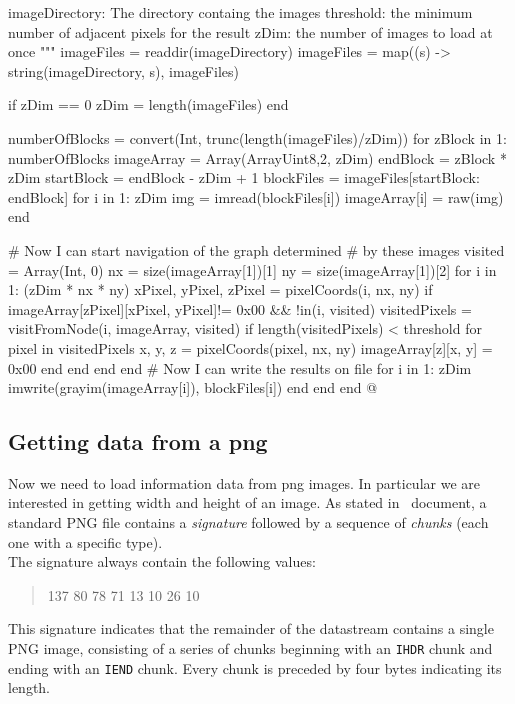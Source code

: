 \documentclass[11pt,oneside]{article}	%
\begin{document}
{  imageDirectory: The directory containg the images
  threshold: the minimum number of adjacent pixels for the result
  zDim: the number of images to load at once
  """
  imageFiles = readdir(imageDirectory)
  imageFiles = map((s) -> string(imageDirectory, s), imageFiles)

  if zDim == 0
    zDim = length(imageFiles)
  end

  numberOfBlocks = convert(Int, trunc(length(imageFiles)/zDim))
  for zBlock in 1: numberOfBlocks
    imageArray = Array(Array{Uint8,2}, zDim)
    endBlock = zBlock * zDim
    startBlock = endBlock - zDim + 1
    blockFiles = imageFiles[startBlock: endBlock]
    for i in 1: zDim
      img = imread(blockFiles[i])
      imageArray[i] = raw(img)
    end

    # Now I can start navigation of the graph determined
    # by these images
    visited = Array(Int, 0)
    nx = size(imageArray[1])[1]
    ny = size(imageArray[1])[2]
    for i in 1: (zDim * nx * ny)
      xPixel, yPixel, zPixel = pixelCoords(i, nx, ny)
      if imageArray[zPixel][xPixel, yPixel]!= 0x00 && !in(i, visited)
        visitedPixels = visitFromNode(i, imageArray, visited)
        if length(visitedPixels) < threshold
          for pixel in visitedPixels
            x, y, z = pixelCoords(pixel, nx, ny)
            imageArray[z][x, y] = 0x00
          end
        end
      end
    end
    # Now I can write the results on file
    for i in 1: zDim
      imwrite(grayim(imageArray[i]), blockFiles[i])
    end
  end
end @}

\subsection{Getting data from a png}\label{sec:getData}

Now we need to load information data from png images. In particular we are interested in getting width and height of an image. As stated in~\cite{W3CPNG} document, a standard PNG file contains a \textit{signature} followed by a sequence of \textit{chunks} (each one with a specific type).\\

The signature always contain the following values:

\begin{quote}
 137 80 78 71 13 10 26 10
\end{quote}
   
This signature indicates that the remainder of the datastream contains a single PNG image, consisting of a series of chunks beginning with an \texttt{IHDR} chunk and ending with an \texttt{IEND} chunk. Every chunk is preceded by four bytes indicating its length.
\end{document}
